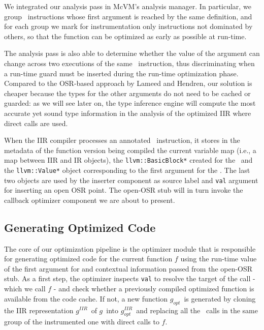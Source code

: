 We integrated our analysis pass in McVM's analysis manager. In particular, we group \feval\ instructions whose first argument is reached by the same definition, and for each group we mark for instrumentation only instructions not dominated by others, so that the function can be optimized as early as possible at run-time.

The analysis pass is also able to determine whether the value of the argument can change across two executions of the same \feval\ instruction, thus discriminating when a run-time guard must be inserted during the run-time optimization phase. Compared to the OSR-based approach by Lameed and Hendren, our solution is cheaper because the types for the other arguments do not need to be cached or guarded: as we will see later on, the type inference engine will compute the most accurate yet sound type information in the analysis of the optimized IIR where direct calls are used.

When the IIR compiler processes an annotated \feval\ instruction, it stores in the metadata of the function version being compiled the current variable map (i.e., a map between IIR and IR objects), the {\tt llvm::BasicBlock*} created for the \feval\ and the {\tt llvm::Value*} object corresponding to the first argument for the \feval. The last two objects are used by the inserter component as source label and {\tt val} argument for inserting an open OSR point. The open-OSR stub will in turn invoke the callback optimizer component we are about to present.

\newcommand{\gbase}{$g$}
\newcommand{\gOpt}{$g_{opt}$}
\newcommand{\gIIR}{$g^{IIR}$}
\newcommand{\gIR}{$g^{IR}$}
\newcommand{\gOptIIR}{$g^{IIR}_{opt}$}
\newcommand{\gOptIR}{$g^{IR}_{opt}$}

\subsection{Generating Optimized Code}
The core of our optimization pipeline is the optimizer module that is responsible for generating optimized code for the current function $f$ using the run-time value of the first argument for \feval and contextual information passed from the open-OSR stub. As a first step, the optimizer inspects {\tt val} to resolve the target of the call - which we call $f$ -  and check whether a previously compiled optimized function is available from the code cache. If not, a new function \gOpt\ is generated by cloning the IIR representation \gIIR\ of \gbase\ into \gOptIIR\ and replacing all the \feval\ calls in the same group of the instrumented one with direct calls to $f$.

